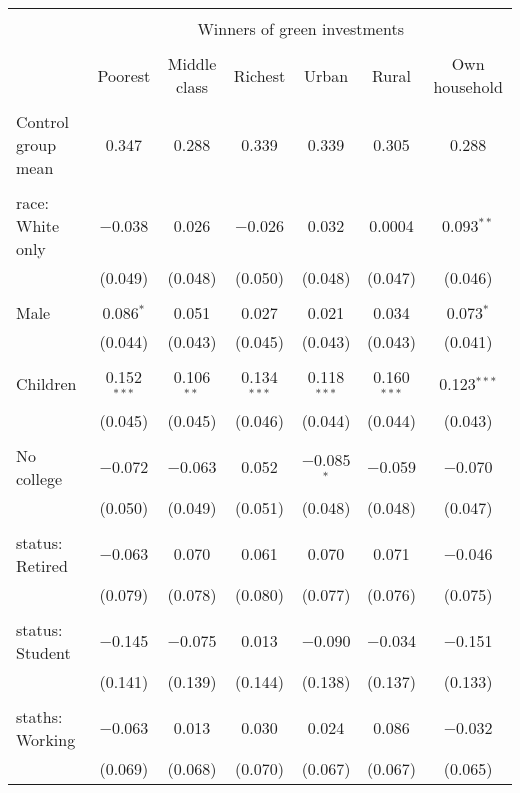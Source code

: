
\begin{tabular}{@{\extracolsep{5pt}}lcccccc} 
\\[-1.8ex]\hline 
\hline \\[-1.8ex] 
 & \multicolumn{6}{c}{Winners of green investments} \\ 
\cline{2-7} 
\\[-1.8ex] & Poorest & Middle class & Richest & Urban & Rural & Own household \\ 
\hline \\[-1.8ex] 
 Control group mean & 0.347 & 0.288 & 0.339 & 0.339 & 0.305 & 0.288  \\ \hline \\[-1.8ex] race: White only & $-$0.038 & 0.026 & $-$0.026 & 0.032 & 0.0004 & 0.093$^{**}$ \\ 
  & (0.049) & (0.048) & (0.050) & (0.048) & (0.047) & (0.046) \\ 
  & & & & & & \\ 
 Male & 0.086$^{*}$ & 0.051 & 0.027 & 0.021 & 0.034 & 0.073$^{*}$ \\ 
  & (0.044) & (0.043) & (0.045) & (0.043) & (0.043) & (0.041) \\ 
  & & & & & & \\ 
 Children & 0.152$^{***}$ & 0.106$^{**}$ & 0.134$^{***}$ & 0.118$^{***}$ & 0.160$^{***}$ & 0.123$^{***}$ \\ 
  & (0.045) & (0.045) & (0.046) & (0.044) & (0.044) & (0.043) \\ 
  & & & & & & \\ 
 No college & $-$0.072 & $-$0.063 & 0.052 & $-$0.085$^{*}$ & $-$0.059 & $-$0.070 \\ 
  & (0.050) & (0.049) & (0.051) & (0.048) & (0.048) & (0.047) \\ 
  & & & & & & \\ 
 status: Retired & $-$0.063 & 0.070 & 0.061 & 0.070 & 0.071 & $-$0.046 \\ 
  & (0.079) & (0.078) & (0.080) & (0.077) & (0.076) & (0.075) \\ 
  & & & & & & \\ 
 status: Student & $-$0.145 & $-$0.075 & 0.013 & $-$0.090 & $-$0.034 & $-$0.151 \\ 
  & (0.141) & (0.139) & (0.144) & (0.138) & (0.137) & (0.133) \\ 
  & & & & & & \\ 
 staths: Working & $-$0.063 & 0.013 & 0.030 & 0.024 & 0.086 & $-$0.032 \\ 
  & (0.069) & (0.068) & (0.070) & (0.067) & (0.067) & (0.065) \\ 

\end{tabular}
